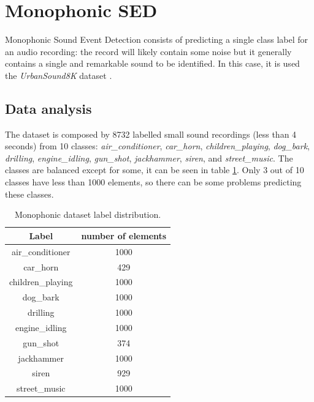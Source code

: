 \documentclass{article}
\begin{document}
\section{Monophonic SED}
\label{sec:mono}

Monophonic Sound Event Detection consists of predicting a single class label for an audio recording: the record will likely contain some noise but it generally contains a single and remarkable sound to be identified. In this case, it is used the \textit{UrbanSound8K} dataset \cite{Salamon:UrbanSound:ACMMM:14}.

\subsection{Data analysis}
\label{subsec:mono_analysis}

The dataset is composed by 8732 labelled small sound recordings (less than 4 seconds) from 10 classes: \textit{air\_conditioner}, \textit{car\_horn}, \textit{children\_playing}, \textit{dog\_bark}, \textit{drilling}, \textit{engine\_idling}, \textit{gun\_shot}, \textit{jackhammer}, \textit{siren}, and \textit{street\_music}. The classes are balanced except for some, it can be seen in table \ref{tab:mono_distribution}. Only 3 out of 10 classes have less than 1000 elements, so there can be some problems predicting these classes.

\begin{table}[H]
	\begin{center}
		\begin{tabular}{ |c | c | }
			\hline
			Label 				& number of elements \\ 
			\hline
			air\_conditioner 	& 1000 \\
			\hline
			car\_horn 			& 429 \\
			\hline
			children\_playing 	& 1000 \\
			\hline
			dog\_bark 			& 1000 \\
			\hline
			drilling 			& 1000 \\
			\hline
			engine\_idling 		& 1000 \\
			\hline
			gun\_shot 			& 374 \\
			\hline
			jackhammer 			& 1000 \\
			\hline
			siren 				& 929 \\
			\hline
			street\_music 		& 1000 \\
			\hline
		\end{tabular}
		\caption{Monophonic dataset label distribution.}
		\label{tab:mono_distribution}
	\end{center}
\end{table}
\end{document}
